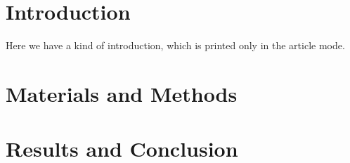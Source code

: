 \documentclass[11pt,presentation,sans]{beamer}
\begin{document}
  \section{Introduction}
    Here we have a kind of introduction, which is printed only in the article mode.
  \section{Materials and Methods}
  \section{Results and Conclusion}
\end{document}
